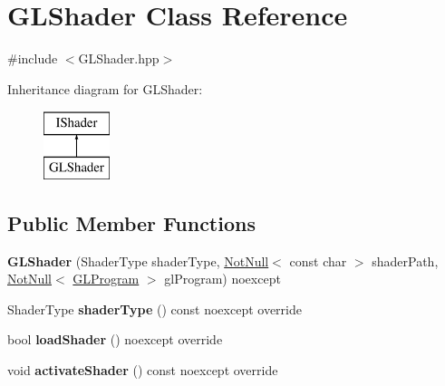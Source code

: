 \hypertarget{class_g_l_shader}{}\section{G\+L\+Shader Class Reference}
\label{class_g_l_shader}


{\ttfamily \#include $<$G\+L\+Shader.\+hpp$>$}

Inheritance diagram for G\+L\+Shader\+:\begin{figure}[H]
\begin{center}
\leavevmode
\includegraphics[height=2.000000cm]{class_g_l_shader}
\end{center}
\end{figure}
\subsection*{Public Member Functions}
\begin{DoxyCompactItemize}
\item 
\mbox{\label{class_g_l_shader_ad46f3d02c2fa896227aea1e83aa95286}} 
{\bfseries G\+L\+Shader} (Shader\+Type shader\+Type, \mbox{\hyperlink{class_not_null}{Not\+Null}}$<$ const char $>$ shader\+Path, \mbox{\hyperlink{class_not_null}{Not\+Null}}$<$ \mbox{\hyperlink{class_g_l_program}{G\+L\+Program}} $>$ gl\+Program) noexcept
\item 
\mbox{\label{class_g_l_shader_a6269c8efc2e099fd16275c93c8109b67}} 
Shader\+Type {\bfseries shader\+Type} () const noexcept override
\item 
\mbox{\label{class_g_l_shader_af2012a97450e3b7b1fc5c1569df3a736}} 
bool {\bfseries load\+Shader} () noexcept override
\item 
\mbox{\label{class_g_l_shader_ab3a52ea131e8d8c322f4398a597f24b9}} 
void {\bfseries activate\+Shader} () const noexcept override
\end{DoxyCompactItemize}
